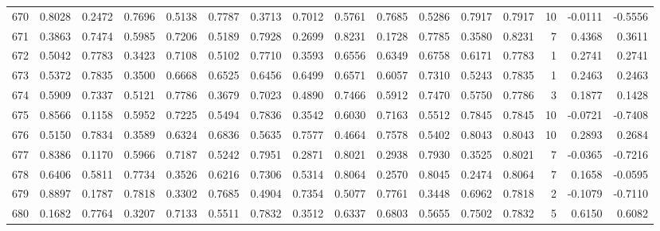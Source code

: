 \begin{tabular}{lrrrrrrrrrrrrrrr}
670 &      0.8028 &  0.2472 &  0.7696 &  0.5138 &  0.7787 &  0.3713 &  0.7012 &  0.5761 &  0.7685 &  0.5286 &   0.7917 &     0.7917 &     10 &                   -0.0111 &                    -0.5556 \\
671 &      0.3863 &  0.7474 &  0.5985 &  0.7206 &  0.5189 &  0.7928 &  0.2699 &  0.8231 &  0.1728 &  0.7785 &   0.3580 &     0.8231 &      7 &                    0.4368 &                     0.3611 \\
672 &      0.5042 &  0.7783 &  0.3423 &  0.7108 &  0.5102 &  0.7710 &  0.3593 &  0.6556 &  0.6349 &  0.6758 &   0.6171 &     0.7783 &      1 &                    0.2741 &                     0.2741 \\
673 &      0.5372 &  0.7835 &  0.3500 &  0.6668 &  0.6525 &  0.6456 &  0.6499 &  0.6571 &  0.6057 &  0.7310 &   0.5243 &     0.7835 &      1 &                    0.2463 &                     0.2463 \\
674 &      0.5909 &  0.7337 &  0.5121 &  0.7786 &  0.3679 &  0.7023 &  0.4890 &  0.7466 &  0.5912 &  0.7470 &   0.5750 &     0.7786 &      3 &                    0.1877 &                     0.1428 \\
675 &      0.8566 &  0.1158 &  0.5952 &  0.7225 &  0.5494 &  0.7836 &  0.3542 &  0.6030 &  0.7163 &  0.5512 &   0.7845 &     0.7845 &     10 &                   -0.0721 &                    -0.7408 \\
676 &      0.5150 &  0.7834 &  0.3589 &  0.6324 &  0.6836 &  0.5635 &  0.7577 &  0.4664 &  0.7578 &  0.5402 &   0.8043 &     0.8043 &     10 &                    0.2893 &                     0.2684 \\
677 &      0.8386 &  0.1170 &  0.5966 &  0.7187 &  0.5242 &  0.7951 &  0.2871 &  0.8021 &  0.2938 &  0.7930 &   0.3525 &     0.8021 &      7 &                   -0.0365 &                    -0.7216 \\
678 &      0.6406 &  0.5811 &  0.7734 &  0.3526 &  0.6216 &  0.7306 &  0.5314 &  0.8064 &  0.2570 &  0.8045 &   0.2474 &     0.8064 &      7 &                    0.1658 &                    -0.0595 \\
679 &      0.8897 &  0.1787 &  0.7818 &  0.3302 &  0.7685 &  0.4904 &  0.7354 &  0.5077 &  0.7761 &  0.3448 &   0.6962 &     0.7818 &      2 &                   -0.1079 &                    -0.7110 \\
680 &      0.1682 &  0.7764 &  0.3207 &  0.7133 &  0.5511 &  0.7832 &  0.3512 &  0.6337 &  0.6803 &  0.5655 &   0.7502 &     0.7832 &      5 &                    0.6150 &                     0.6082 \\

\end{tabular}

